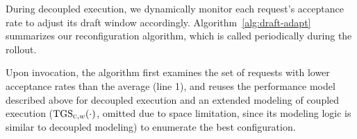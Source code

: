 \begin{algorithm}[t]
\caption{Request-level Reconfiguration for Reducing mis-speculation overheads during the rollout. }
\label{alg:draft-adapt}






    

\end{algorithm}

During decoupled execution, we dynamically monitor each request's
acceptance rate to adjust its draft window accordingly. 
Algorithm~\ref{alg:draft-adapt} summarizes our reconfiguration algorithm,
which is called periodically during the rollout.

Upon invocation, the algorithm first examines the set of requests
{with lower acceptance rates than the average (line {1}),}
and reuses the performance model described above for decoupled execution 
and an extended modeling
of coupled execution
 ($\text{TGS}_{\textsc{c}, w}(\cdot)$, omitted due to space limitation,
 since its modeling logic is similar to decoupled modeling)
 to enumerate the best configuration.

